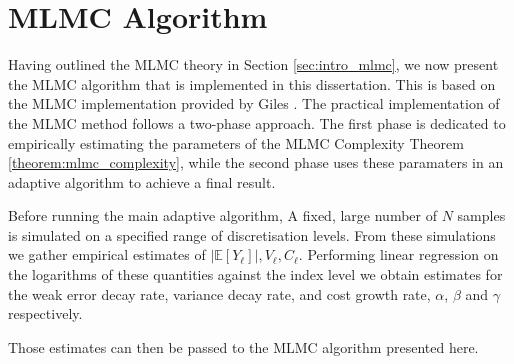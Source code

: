 \section{MLMC Algorithm}\label{sec:mlmc_algorithm}

Having outlined the MLMC theory in Section \ref{sec:intro_mlmc}, we now present 
the MLMC algorithm that is implemented in this dissertation. This is 
based on the MLMC implementation provided by Giles \cite{giles2015multilevel}.
The practical implementation of the MLMC method follows a two-phase approach.
The first phase is dedicated to empirically estimating the parameters 
of the MLMC Complexity Theorem \ref{theorem:mlmc_complexity}, while the
second phase uses these paramaters in an adaptive algorithm 
to achieve a final result.

Before running the main adaptive algorithm, A fixed, large number of $N$ 
samples is simulated on a specified range of discretisation levels. From 
these simulations we gather empirical estimates of $|\mathbb{E}[Y_\ell]|, 
V_\ell, C_\ell$. Performing linear regression on the logarithms of these
quantities against the index level we obtain estimates for the weak error 
decay rate, variance decay rate, and cost growth rate, $\alpha$, $\beta$ and $\gamma$ 
respectively. 

Those estimates can then be passed to the MLMC algorithm presented here.


